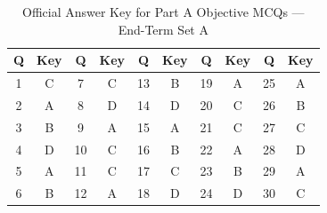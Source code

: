 \begin{table}[h]
\centering\small
\begin{tabular}{|c|c||c|c||c|c||c|c||c|c|}
\hline
\textbf{Q} & \textbf{Key} & \textbf{Q} & \textbf{Key} & \textbf{Q} & \textbf{Key} & \textbf{Q} & \textbf{Key} & \textbf{Q} & \textbf{Key} \\ \hline

1 & C & 7 & C & 13 & B & 19 & A & 25 & A \\ \hline
2 & A & 8 & D & 14 & D & 20 & C & 26 & B \\ \hline
3 & B & 9 & A & 15 & A & 21 & C & 27 & C \\ \hline
4 & D & 10 & C & 16 & B & 22 & A & 28 & D \\ \hline
5 & A & 11 & C & 17 & C & 23 & B & 29 & A \\ \hline
6 & B & 12 & A & 18 & D & 24 & D & 30 & C \\ \hline
\end{tabular}
\caption{Official Answer Key for Part A Objective MCQs --- End-Term Set A}
\end{table}

\newpage
